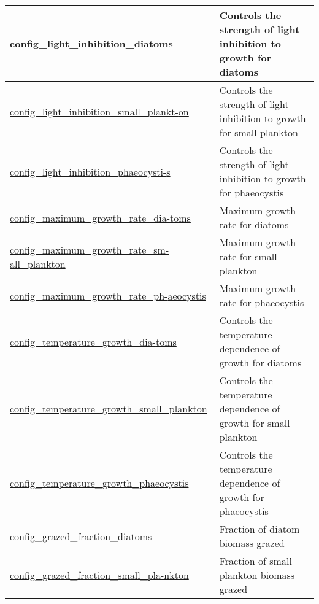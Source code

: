 {\begin{center}
\begin{longtable}{| p{2.0in} || p{4.0in} |}
    \hline
    \hyperref[subsec:nm_sec_config_light_inhibition_diatoms]{config\_light\_inhibition\_diatoms} & Controls the strength of light inhibition to growth for diatoms \\
    \hline
    \hyperref[subsec:nm_sec_config_light_inhibition_small_plankton]{config\_light\_inhibition\_small\_plankt-}\hyperref[subsec:nm_sec_config_light_inhibition_small_plankton]{on}& Controls the strength of light inhibition to growth for small plankton \\
    \hline
    \hyperref[subsec:nm_sec_config_light_inhibition_phaeocystis]{config\_light\_inhibition\_phaeocysti-}\hyperref[subsec:nm_sec_config_light_inhibition_phaeocystis]{s}& Controls the strength of light inhibition to growth for phaeocystis \\
    \hline
    \hyperref[subsec:nm_sec_config_maximum_growth_rate_diatoms]{config\_maximum\_growth\_rate\_dia-}\hyperref[subsec:nm_sec_config_maximum_growth_rate_diatoms]{toms}& Maximum growth rate for diatoms \\
    \hline
    \hyperref[subsec:nm_sec_config_maximum_growth_rate_small_plankton]{config\_maximum\_growth\_rate\_sm-}\hyperref[subsec:nm_sec_config_maximum_growth_rate_small_plankton]{all\_plankton}& Maximum growth rate for small plankton \\
    \hline
    \hyperref[subsec:nm_sec_config_maximum_growth_rate_phaeocystis]{config\_maximum\_growth\_rate\_ph-}\hyperref[subsec:nm_sec_config_maximum_growth_rate_phaeocystis]{aeocystis}& Maximum growth rate for phaeocystis \\
    \hline
    \hyperref[subsec:nm_sec_config_temperature_growth_diatoms]{config\_temperature\_growth\_dia-}\hyperref[subsec:nm_sec_config_temperature_growth_diatoms]{toms}& Controls the temperature dependence of growth for diatoms \\
    \hline
    \hyperref[subsec:nm_sec_config_temperature_growth_small_plankton]{config\_temperature\_growth\_small\_plankton} & Controls the temperature dependence of growth for small plankton \\
    \hline
    \hyperref[subsec:nm_sec_config_temperature_growth_phaeocystis]{config\_temperature\_growth\_phaeocystis} & Controls the temperature dependence of growth for phaeocystis \\
    \hline
    \hyperref[subsec:nm_sec_config_grazed_fraction_diatoms]{config\_grazed\_fraction\_diatoms} & Fraction of diatom biomass grazed \\
    \hline
    \hyperref[subsec:nm_sec_config_grazed_fraction_small_plankton]{config\_grazed\_fraction\_small\_pla-}\hyperref[subsec:nm_sec_config_grazed_fraction_small_plankton]{nkton}& Fraction of small plankton biomass grazed \\

\end{longtable}
\end{center}}
